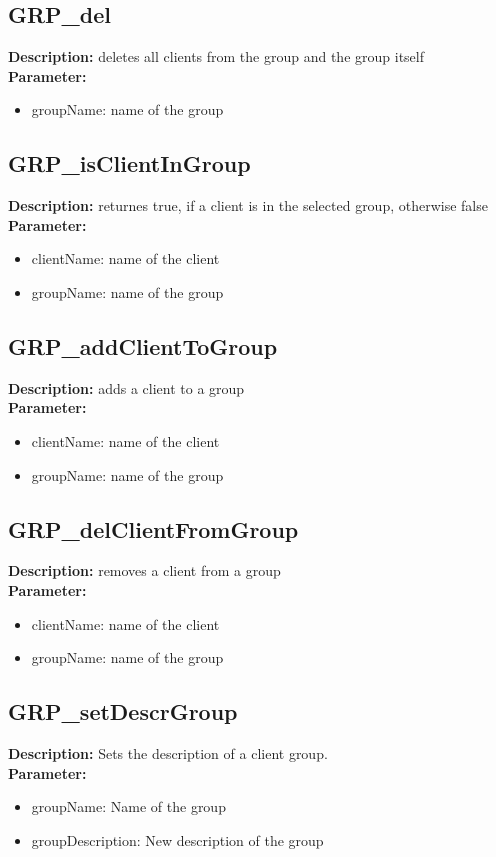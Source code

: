 \subsection{GRP\_del}
\textbf{Description:} deletes all clients from the group and the group itself\\
\textbf{Parameter:}
\begin{itemize}
\item groupName: name of the group
\end{itemize}

\subsection{GRP\_isClientInGroup}
\textbf{Description:} returnes true, if a client is in the selected group, otherwise false\\
\textbf{Parameter:}
\begin{itemize}
\item clientName: name of the client 
\item groupName: name of the group
\end{itemize}

\subsection{GRP\_addClientToGroup}
\textbf{Description:} adds a client to a group\\
\textbf{Parameter:}
\begin{itemize}
\item clientName: name of the client 
\item groupName: name of the group
\end{itemize}

\subsection{GRP\_delClientFromGroup}
\textbf{Description:} removes a client from a group\\
\textbf{Parameter:}
\begin{itemize}
\item clientName: name of the client 
\item groupName: name of the group
\end{itemize}

\subsection{GRP\_setDescrGroup}
\textbf{Description:} Sets the description of a client group.\\
\textbf{Parameter:}
\begin{itemize}
\item groupName: Name of the group
\item groupDescription: New description of the group
\end{itemize}

